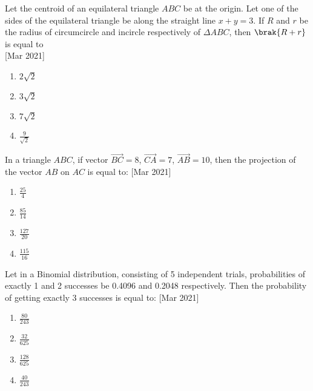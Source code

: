     \item{
            Let the centroid of an equilateral triangle $ABC$ be at the origin. Let one of the sides of the equilateral triangle be along the straight line $x + y = 3$. If $R$ and $r$ be the radius of circumcircle and incircle respectively of $\Delta ABC$, then $\brak{R + r}$ is equal to\\ \text{ }
             \hfill
                {[Mar 2021]}
            \begin{multicols}{4}
                \begin{enumerate}
                    \item $2\sqrt{2}$    
                    \item $3\sqrt{2}$    
                    \item $7\sqrt{2}$    
                    \item $\frac{9}{\sqrt{2}}$
                \end{enumerate}
            \end{multicols}

        
        }
    \item{
            In a triangle $ABC$, if vector $\overrightarrow{BC} = 8$, $\overrightarrow{CA} = 7$, $\overrightarrow{AB} = 10$, then the projection of the vector $AB$ on $AC$ is equal to:
             \hfill
                {[Mar 2021]}
            \begin{multicols}{4}
                \begin{enumerate}
                	\item $\frac{25}{4}$ 
                	\item $\frac{85}{14}$ 
                	\item $\frac{127}{20}$ 
                	\item $\frac{115}{16}$
                \end{enumerate}
            \end{multicols}
        
        }
    \item{
            Let in a Binomial distribution, consisting of 5 independent trials, probabilities of exactly 1 and 2 successes be 0.4096 and 0.2048 respectively. Then the probability of getting exactly 3 successes is equal to:
             \hfill
                {[Mar 2021]}
			\begin{multicols}{4}
				\begin{enumerate}
					\item $\frac{80}{243}$
					\item $\frac{32}{625}$
					\item $\frac{128}{625}$
					\item $\frac{40}{243}$
				\end{enumerate}
			\end{multicols}
        
        }
